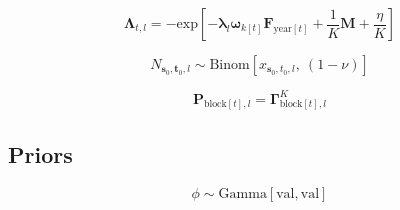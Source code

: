 \documentclass{article}
\begin{document}

\begin{equation}
  \label{eq:model-survival}
    \boldsymbol{\Lambda}_{t,l} = 
    - \mathrm{exp} \! \left[ -
    \boldsymbol{\lambda}_{l} \boldsymbol{\omega}_{k[t]}  
    \boldsymbol{F}_{\mathrm{year}[t]} + \frac{1}{K} \boldsymbol{M} + \frac{\eta}{K} \right]
\end{equation}


\begin{equation}
  \label{eq:model-release}
  N_{\boldsymbol{s}_{0},\boldsymbol{t}_{0},l} \sim 
    \mathrm{Binom} \! \left[ x_{\boldsymbol{s}_{0},t_{0},l} \mathrm{,} \: \left( 1 - \nu \right) \right]
\end{equation}

\begin{equation}
  \label{eq:model-movement}
  \boldsymbol{P}_{\mathrm{block}[t],l} = \boldsymbol{\Gamma}^{K}_{\mathrm{block}[t],l}
\end{equation}



\subsection{Priors}

\begin{equation}
  \label{eq:prior-dispersion}
  \phi \sim \mathrm{Gamma} \! \left[ \mathrm{val, val} \right]
\end{equation}
\end{document}
